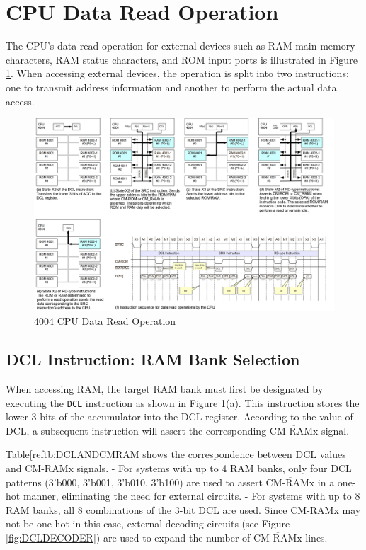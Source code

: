 \section{CPU Data Read Operation}
The CPU's data read operation for external devices such as RAM main memory characters, RAM status characters, and ROM input ports is illustrated in Figure \ref{fig:CPUINSTRUCTIONREAD}. When accessing external devices, the operation is split into two instructions: one to transmit address information and another to perform the actual data access.

\begin{figure}[htbp]
    \includegraphics[width=1.0\columnwidth]{./Figure/CPUInstructionRead.png}
    \caption{4004 CPU Data Read Operation}
    \label{fig:CPUINSTRUCTIONREAD}
\end{figure}
\subsection{DCL Instruction: RAM Bank Selection}
When accessing RAM, the target RAM bank must first be designated by executing the \texttt{DCL} instruction as shown in Figure \ref{fig:CPUINSTRUCTIONREAD}(a). This instruction stores the lower 3 bits of the accumulator into the DCL register. According to the value of DCL, a subsequent instruction will assert the corresponding $\overline{\text{CM-RAMx}}$ signal.

Table[ref{tb:DCLANDCMRAM} shows the correspondence between DCL values and CM-RAMx signals.  
- For systems with up to 4 RAM banks, only four DCL patterns (3'b000, 3'b001, 3'b010, 3'b100) are used to assert $\overline{\text{CM-RAMx}}$ in a one-hot manner, eliminating the need for external circuits.  
- For systems with up to 8 RAM banks, all 8 combinations of the 3-bit DCL are used. Since $\overline{\text{CM-RAMx}}$ may not be one-hot in this case, external decoding circuits (see Figure \ref{fig:DCLDECODER}) are used to expand the number of $\overline{\text{CM-RAMx}}$ lines.

